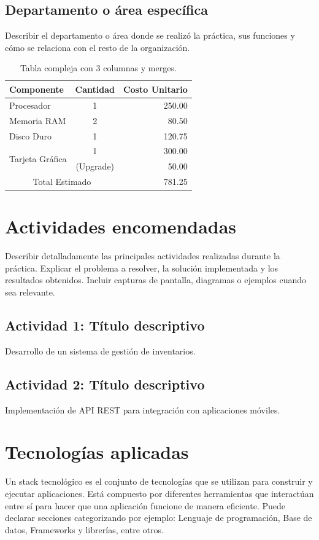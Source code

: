 \documentclass[12pt, a4paper]{article}
\begin{document}
\subsection{Departamento o área específica}
Describir el departamento o área donde se realizó la práctica, sus funciones y cómo se relaciona con el resto de la organización.

\begin{table}[h]
    \centering
    \caption{Tabla compleja con 3 columnas y merges.}
    \label{tab:complex}
    \begin{tabular}{|l|c|r|}
        \hline
        \textbf{Componente} & \textbf{Cantidad} & \textbf{Costo Unitario} \\
        \hline
        Procesador & 1 & 250.00 \\
        \hline
        Memoria RAM & 2 & 80.50 \\
        \hline
        Disco Duro & 1 & 120.75 \\
        \hline
        \multirow{2}{*}{Tarjeta Gráfica} & 1 & 300.00 \\
        & (Upgrade) & 50.00 \\
        \hline
        \multicolumn{2}{|c|}{Total Estimado} & 781.25 \\
        \hline
    \end{tabular}
\end{table}

\section{Actividades encomendadas}
Describir detalladamente las principales actividades realizadas durante la práctica. Explicar el problema a resolver, la solución implementada y los resultados obtenidos. Incluir capturas de pantalla, diagramas o ejemplos cuando sea relevante.

\subsection{Actividad 1: Título descriptivo}
Desarrollo de un sistema de gestión de inventarios.

\subsection{Actividad 2: Título descriptivo}
Implementación de API REST para integración con aplicaciones móviles.

\section{Tecnologías aplicadas}
Un stack tecnológico es el conjunto de tecnologías que se utilizan para construir y ejecutar aplicaciones. Está compuesto por diferentes herramientas que interactúan entre sí para hacer que una aplicación funcione de manera eficiente. Puede declarar secciones categorizando por ejemplo: Lenguaje de programación, Base de datos, Frameworks y librerías, entre otros.
\end{document}
